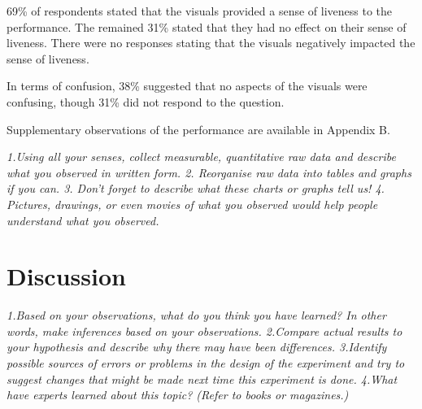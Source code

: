 69\% of respondents stated that the visuals provided a sense of liveness to the performance. The remained 31\% stated that they had no effect on their sense of liveness. There were no responses stating that the visuals negatively impacted the sense of liveness. 

In terms of confusion, 38\% suggested that no aspects of the visuals were confusing, though 31\% did not respond to the question.

Supplementary observations of the performance are available in Appendix B.

\textit{1.Using all your senses, collect measurable, quantitative raw data and describe what you observed in written form.
2. Reorganise raw data into tables and graphs if you can.
3. Don't forget to describe what these charts or graphs tell us!
4. Pictures, drawings, or even movies of what you observed would help people understand what you observed.}

\section{Discussion}

\textit{1.Based on your observations, what do you think you have learned? In other words, make inferences based on your observations.
2.Compare actual results to your hypothesis and describe why there may have been differences.
3.Identify possible sources of errors or problems in the design of the experiment and try to suggest changes that might be made next time this experiment is done.
4.What have experts learned about this topic? (Refer to books or magazines.)}






